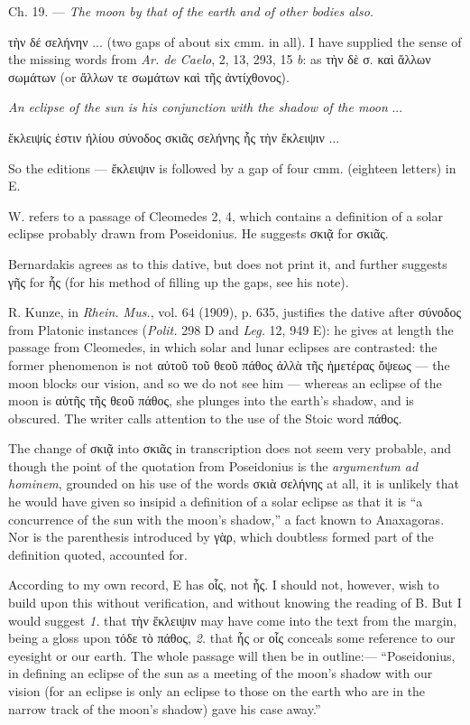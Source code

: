 \documentclass[a4paper, 11pt, oneside, polutonikogreek, english]{article}
\begin{document}
Ch. 19. --- \emph{The moon by that of the earth and of other bodies also.}

τὴν δέ σελήνην ... (two gaps of about six cmm. in all). I have supplied the sense of the missing words from \emph{Ar. de Caelo}, 2, 13, 293, 15 \emph{b}: as τὴν δὲ σ. καὶ ἄλλων σωμάτων (or ἄλλων τε σωμάτων καὶ τῆς ἀντίχθονος).

\emph{An eclipse of the sun is his conjunction with the shadow of the moon} ...

ἔκλειψίς ἐστιν ἡλίου σύνοδος σκιᾶς σελήνης ἧς τὴν ἔκλειψιν ...

So the editions --- ἔκλειψιν is followed by a gap of four cmm. (eighteen letters) in E.

W. refers to a passage of Cleomedes 2, 4, which contains a definition of a solar eclipse probably drawn from Poseidonius. He suggests σκιᾷ for σκιᾶς.

Bernardakis agrees as to this dative, but does not print it, and further suggests γῆς for ἧς (for his method of filling up the gaps, see his note).

R. Kunze, in \emph{Rhein. Mus.}, vol. 64 (1909), p. 635, justifies the dative after σύνοδος from Platonic instances (\emph{Polit.} 298 D and \emph{Leg.} 12, 949 E): he gives at length the passage from Cleomedes, in which solar and lunar eclipses are contrasted: the former phenomenon is not αὐτοῦ τοῦ θεοῦ πάθος ἀλλὰ τῆς ἡμετέρας ὄψεως --- the moon blocks our vision, and so we do not see him --- whereas an eclipse of the moon is αὐτῆς τῆς θεοῦ πάθος, she plunges into the earth's shadow, and is obscured. The writer calls attention to the use of the Stoic word πάθος.

The change of σκιᾷ into σκιᾶς in transcription does not seem very probable, and though the point of the quotation from Poseidonius is the \emph{argumentum ad hominem}, grounded on his use of the words σκιὰ σελήνης at all, it is unlikely that he would have given so insipid a definition of a solar eclipse as that it is ``a concurrence of the sun with the moon's shadow,'' a fact known to Anaxagoras. Nor is the parenthesis introduced by γὰρ, which doubtless formed part of the definition quoted, accounted for.

According to my own record, E has οἷς, not ἧς. I should not, however, wish to build upon this without verification, and without knowing the reading of B. But I would suggest \emph{1.} that τὴν ἔκλειψιν may have come into the text from the margin, being a gloss upon τόδε τὸ πάθος, \emph{2.} that ἧς or οἷς conceals some reference to our eyesight or our earth. The whole passage will then be in outline:--- ``Poseidonius, in defining an eclipse of the sun as a meeting of the moon's shadow with our vision (for an eclipse is only an eclipse to those on the earth who are in the narrow track of the moon's shadow) gave his case away.''
\end{document}

